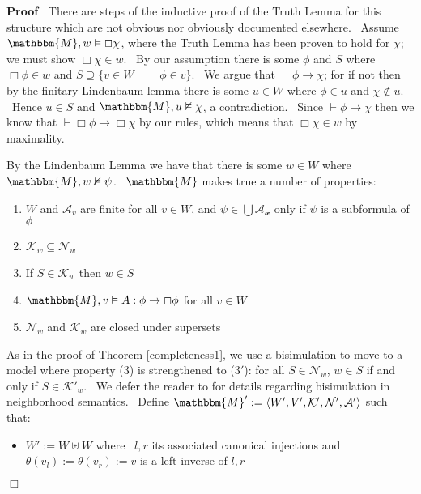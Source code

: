 \documentclass{acmconf}
\newcommand{\assign}{:=}
\newcommand{\nin}{\not\in}
\newenvironment{enumeratenumeric}{\begin{enumerate}[1.] }{\end{enumerate}}
\newenvironment{itemizedot}{\begin{itemize} \renewcommand{\labelitemi}{$\bullet$}\renewcommand{\labelitemii}{$\bullet$}\renewcommand{\labelitemiii}{$\bullet$}\renewcommand{\labelitemiv}{$\bullet$}}{\end{itemize}}
\newenvironment{proof}{\noindent\textbf{Proof\ }}{\hspace*{\fill}$\Box$\medskip}
\begin{document}
\begin{proof}
  There are steps of the inductive proof of the Truth Lemma for this structure
  which are not obvious nor obviously documented elsewhere. \ Assume
  $\mathbbm{M}, w \vDash \Box \chi$, where the Truth Lemma has been proven to
  hold for $\chi$; we must show $\Box \chi \in w$. \ By our assumption there
  is some $\phi$ and $S$ where $\Box \phi \in w$ and $S \supseteq \{v \in W
  \hspace{1em} | \hspace{1em} \phi \in v\}$. \ We argue that $\vdash \phi
  \rightarrow \chi$; for if not then by the finitary Lindenbaum lemma there is
  some $u \in W$ where $\phi \in u$ and $\chi \nin u$. \ Hence $u \in S$ and
  $\mathbbm{M}, u \nvDash \chi$, a contradiction. \ Since $\vdash \phi
  \rightarrow \chi$ then we know that $\vdash \Box \phi \rightarrow \Box \chi$
  by our rules, which means that $\Box \chi \in w$ by maximality.
  
  
  
  By the Lindenbaum Lemma we have that there is some $w \in W$ where
  $\mathbbm{M}, w \nvDash \psi$. \ $\mathbbm{M}$ makes true a number of
  properties:
  \begin{enumeratenumeric}
    \item $W$ and $\mathcal{A}_v$ are finite for all $v \in W$, and $\psi \in
    \bigcup \mathcal{A_w}$ only if $\psi$ is a subformula of $\phi$
    
    \item $\mathcal{K}_w \subseteq \mathcal{N}_w$
    
    \item If $S \in \mathcal{K}_w$ then $w \in S$
    
    \item $\mathbbm{M}, v \vDash A : \phi \rightarrow \Box \phi$ for all $v
    \in W$
    
    \item $\mathcal{N}_w$ and $\mathcal{K}_w$ are closed under supersets
  \end{enumeratenumeric}
  
  
  As in the proof of Theorem \ref{completeness1}, we use a bisimulation to
  move to a model where property (3) is strengthened to (3$'$): for all $S \in
  \mathcal{N}_w$, $w \in S$ if and only if $S \in \mathcal{K}'_w$. \ We defer
  the reader to {\cite{hansen_bisimulation_2007,pauly_bisimulation_1999}} for
  details regarding bisimulation in neighborhood semantics. \ Define
  $\mathbbm{M}' \assign \langle W', V', \mathcal{K}', \mathcal{N}',
  \mathcal{A}' \rangle$ such that:
  \begin{itemizedot}
    \item $W' \assign W \uplus W$ where \ $l, r$ its associated canonical
    injections and $\theta (v_l) \assign \theta (v_r) \assign v$ is a
    left-inverse of $l, r$
    

\end{itemizedot}
\end{proof}
\end{document}

